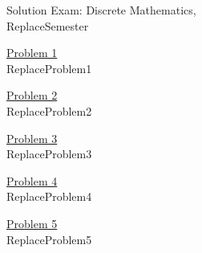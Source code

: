 




\begin{center}
\huge{
Solution Exam: Discrete Mathematics,\\ ReplaceSemester} \\[2em]                                       \end{center}
\large

\underline{Problem 1 }\\[0.5em]
ReplaceProblem1

\vspace{2em}

\underline{Problem 2 }\\[0.5em]
ReplaceProblem2

\vspace{2em}

\underline{Problem 3 }\\[0.5em]
ReplaceProblem3

\vspace{2em}

\underline{Problem 4 }\\[0.5em]
ReplaceProblem4

\vspace{2em}

\underline{Problem 5 }\\[0.5em]
ReplaceProblem5



